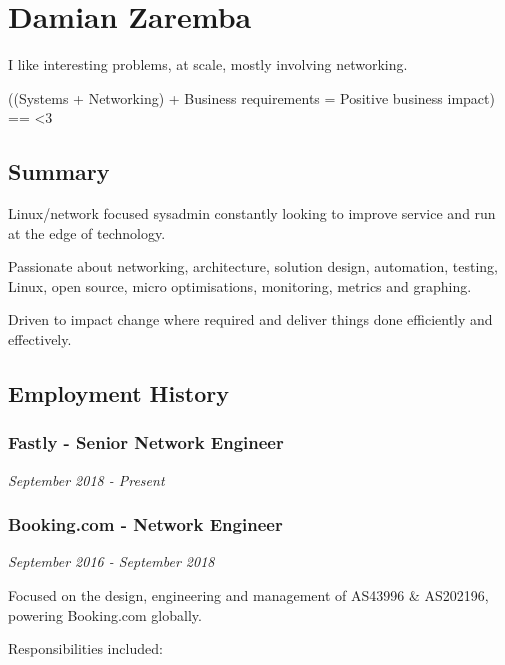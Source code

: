\section{Damian Zaremba}\label{damian-zaremba}

I like interesting problems, at scale, mostly involving networking.

((Systems + Networking) + Business requirements = Positive business
impact) == \textless{}3

\subsection{Summary}\label{summary}

Linux/network focused sysadmin constantly looking to improve service and
run at the edge of technology.

Passionate about networking, architecture, solution design, automation,
testing, Linux, open source, micro optimisations, monitoring, metrics
and graphing.

Driven to impact change where required and deliver things done
efficiently and effectively.

\subsection{Employment History}\label{employment-history}

\subsubsection{Fastly - Senior Network
Engineer}\label{fastly---senior-network-engineer}

\emph{September 2018 - Present}

\subsubsection{Booking.com - Network
Engineer}\label{booking.com---network-engineer}

\emph{September 2016 - September 2018}

Focused on the design, engineering and management of AS43996 \&
AS202196, powering Booking.com globally.

Responsibilities included:

